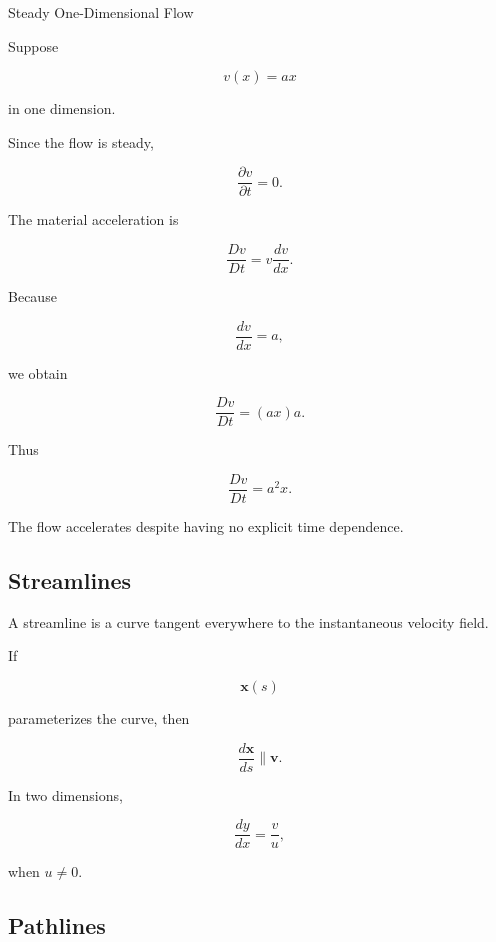\begin{workedexamplebox}{Steady One-Dimensional Flow}

Suppose

\[
v(x)=ax
\]

in one dimension.

Since the flow is steady,

\[
\frac{\partial v}{\partial t}=0.
\]

The material acceleration is

\[
\frac{Dv}{Dt}
=
v\frac{dv}{dx}.
\]

Because

\[
\frac{dv}{dx}=a,
\]

we obtain

\[
\frac{Dv}{Dt}
=
(ax)a.
\]

Thus

\begin{answerbox}
\[
\boxed{
\frac{Dv}{Dt}
=
a^2x.
}
\]
\end{answerbox}

The flow accelerates despite having no explicit time dependence.

\end{workedexamplebox}

\subsection{Streamlines}
\label{subsec:streamlines}

A streamline is a curve tangent everywhere to the instantaneous velocity
field.

If

\[
\mathbf{x}(s)
\]

parameterizes the curve, then

\[
\boxed{
\frac{d\mathbf{x}}{ds}
\parallel
\mathbf{v}.
}
\]

In two dimensions,

\[
\boxed{
\frac{dy}{dx}
=
\frac{v}{u},
}
\]

when \(u\neq0\).

\subsection{Pathlines}
\label{subsec:pathlines}

